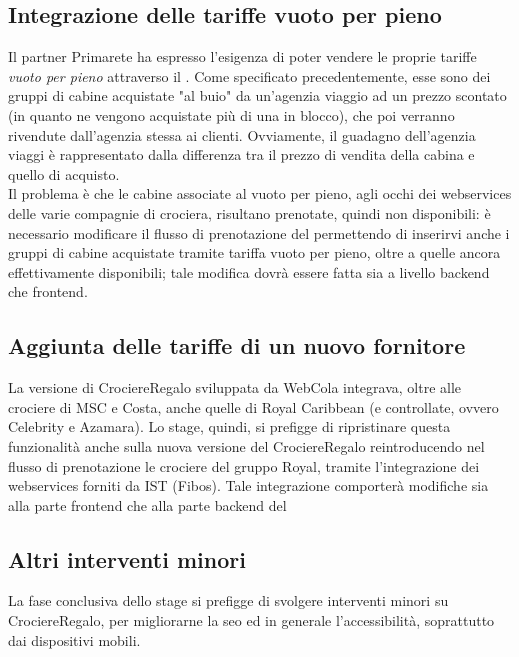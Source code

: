 \subsection{Integrazione delle tariffe vuoto per pieno}
Il partner Primarete ha espresso l'esigenza di poter vendere le proprie tariffe \textit{vuoto per pieno} attraverso il \bookingEngine. Come specificato precedentemente, esse sono dei gruppi di cabine acquistate "al buio" da un'agenzia viaggio ad un prezzo scontato (in quanto ne vengono acquistate più di una in blocco), che poi verranno rivendute dall'agenzia stessa ai clienti. Ovviamente, il guadagno dell'agenzia viaggi è rappresentato dalla differenza tra il prezzo di vendita della cabina e quello di acquisto.\\
Il problema è che le cabine associate al vuoto per pieno, agli occhi dei \glspl{webservice} delle varie compagnie di crociera, risultano prenotate, quindi non disponibili: è necessario modificare il flusso di prenotazione del \bookingEngine permettendo di inserirvi anche i gruppi di cabine acquistate tramite tariffa vuoto per pieno, oltre a quelle ancora effettivamente disponibili; tale modifica dovrà essere fatta sia a livello backend che frontend.

\subsection{Aggiunta delle tariffe di un nuovo fornitore}
La versione di CrociereRegalo sviluppata da WebCola integrava, oltre alle crociere di MSC e Costa, anche quelle di Royal Caribbean (e controllate, ovvero Celebrity e Azamara). Lo stage, quindi, si prefigge di ripristinare questa funzionalità anche sulla nuova versione del \bookingEngine CrociereRegalo reintroducendo nel flusso di prenotazione le crociere del gruppo Royal, tramite l'integrazione dei \glspl{webservice} forniti da IST (Fibos). Tale integrazione comporterà modifiche sia alla parte frontend che alla parte backend del \bookingEngine


\subsection{Altri interventi minori}
\label{section:altri-interventi-minori}
La fase conclusiva dello stage si prefigge di svolgere interventi minori su CrociereRegalo, per migliorarne la \gls{seo} ed in generale l'accessibilità, soprattutto dai dispositivi mobili.

